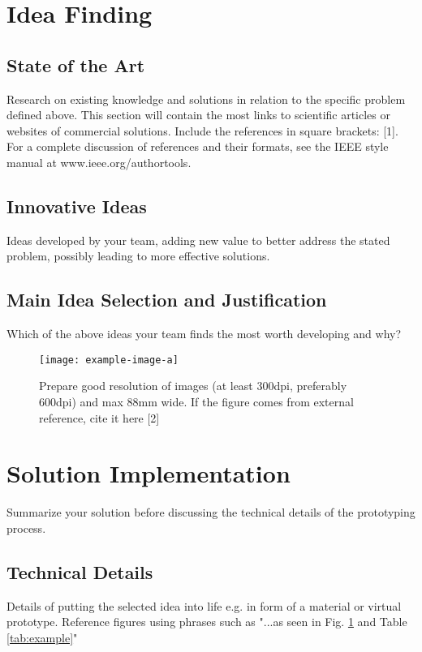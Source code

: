 \documentclass{article}
\begin{document}
\section{Idea Finding}

\subsection{State of the Art}
Research on existing knowledge and solutions in relation to the specific problem defined above. This section will contain the most links to scientific articles or websites of commercial solutions. Include the references in square brackets: [1]. For a complete discussion of references and their formats, see the IEEE style manual at www.ieee.org/authortools.

\subsection{Innovative Ideas}
Ideas developed by your team, adding new value to better address the stated problem, possibly leading to more effective solutions.

\subsection{Main Idea Selection and Justification}
Which of the above ideas your team finds the most worth developing and why?

\begin{figure}[h!]
    \centering
    \texttt{[image: example-image-a]}
    \caption{Prepare good resolution of images (at least 300dpi, preferably 600dpi) and max 88mm wide. If the figure comes from external reference, cite it here [2]}
    \label{fig:example}
\end{figure}

\section{Solution Implementation}
Summarize your solution before discussing the technical details of the prototyping process.

\subsection{Technical Details}
Details of putting the selected idea into life e.g. in form of a material or virtual prototype. Reference figures using phrases such as "...as seen in Fig. \ref{fig:example} and Table \ref{tab:example}"
\end{document}
